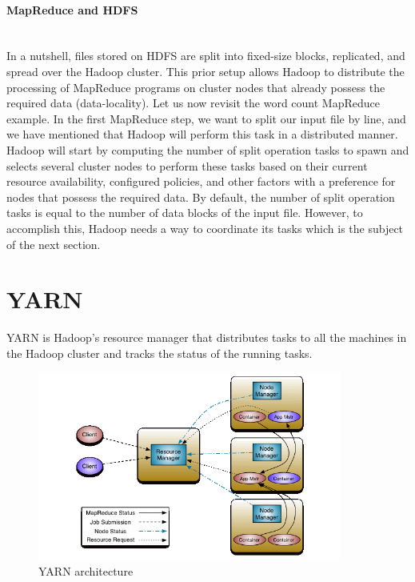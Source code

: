 \documentclass[12pt,english]{book}
\begin{document}
\paragraph{MapReduce and HDFS}\mbox{}\\

In a nutshell, files stored on HDFS are split into fixed-size blocks, replicated, and spread over the Hadoop cluster.
This prior setup allows Hadoop to distribute the processing of MapReduce programs on cluster nodes that already possess the required data (data-locality).
Let us now revisit the word count MapReduce example.
In the first MapReduce step, we want to split our input file by line, and we
have mentioned that Hadoop will perform this task in a distributed manner.
Hadoop will start by computing the number of split operation tasks to spawn and selects several cluster nodes to perform these tasks based on their current resource availability, configured policies, and other factors with a preference for nodes that possess the required data.
By default, the number of split operation tasks is equal to the number of data blocks of the input file.
However, to accomplish this, Hadoop needs a way to coordinate its tasks which is the subject of the next section.

\section{YARN}

YARN is Hadoop's resource manager that distributes tasks to all the machines in the Hadoop cluster and tracks the status of the running tasks.

\begin{figure}[ht]
	\centering
	\includegraphics[width=10cm]{yarnArch}
	\caption[YARN architecture]{YARN architecture \footnotemark}
\label{fig:YARNarchitecture}
\end{figure}

\end{document}
